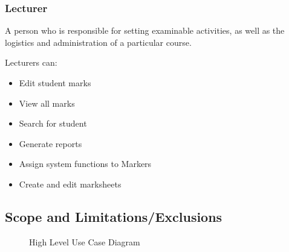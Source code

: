 \documentclass[a4paper]{article}
\begin{document}
			\subsubsection{Lecturer}
				\begin{flushleft}
				A person who is responsible for setting examinable activities, as well as the logistics and administration of a particular course. \linebreak 
				
				Lecturers can:
				\end{flushleft}
				\begin{itemize}

					\item{Edit student marks}
					
					\item{View all marks}
					
					\item{Search for student}
					
					\item{Generate reports}
					
					\item{Assign system functions to Markers}
					
					\item{Create and edit marksheets}

				\end{itemize}
			
			\subsection{Scope and Limitations/Exclusions}
			\begin{figure}[h]
				\caption{High Level Use Case Diagram}
			\end{figure}
\end{document}
